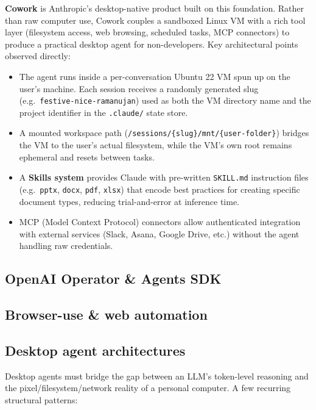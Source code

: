\textbf{Cowork} is Anthropic's desktop-native product built on this foundation. Rather
than raw computer use, Cowork couples a sandboxed Linux VM with a rich tool layer
(filesystem access, web browsing, scheduled tasks, MCP connectors) to produce a
practical desktop agent for non-developers. Key architectural points observed directly:

\begin{itemize}
  \item The agent runs inside a per-conversation Ubuntu 22 VM spun up on the user's
    machine. Each session receives a randomly generated slug
    (e.g.\ \texttt{festive-nice-ramanujan}) used as both the VM directory name and the
    project identifier in the \texttt{.claude/} state store.
  \item A mounted workspace path (\texttt{/sessions/\{slug\}/mnt/\{user-folder\}})
    bridges the VM to the user's actual filesystem, while the VM's own root remains
    ephemeral and resets between tasks.
  \item A \textbf{Skills system} provides Claude with pre-written \texttt{SKILL.md}
    instruction files (e.g.\ \texttt{pptx}, \texttt{docx}, \texttt{pdf}, \texttt{xlsx})
    that encode best practices for creating specific document types, reducing trial-and-error
    at inference time.
  \item MCP (Model Context Protocol) connectors allow authenticated integration with
    external services (Slack, Asana, Google Drive, etc.) without the agent handling
    raw credentials.
\end{itemize}

\subsection{OpenAI Operator \& Agents SDK}


\subsection{Browser-use \& web automation}


\subsection{Desktop agent architectures}

Desktop agents must bridge the gap between an LLM's token-level reasoning and the
pixel/filesystem/network reality of a personal computer. A few recurring structural
patterns:

